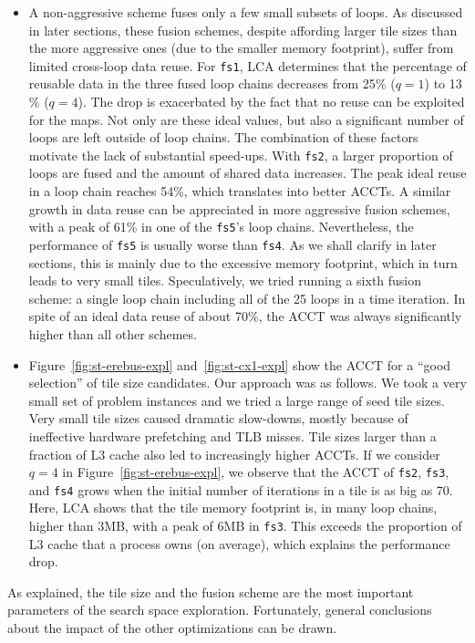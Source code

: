 \begin{itemize}
\item A non-aggressive scheme fuses only a few small subsets of loops. As discussed in later sections, these fusion schemes, despite affording larger tile sizes than the more aggressive ones (due to the smaller memory footprint), suffer from limited cross-loop data reuse. For {\tt fs1}, LCA determines that the percentage of reusable data in the three fused loop chains decreases from 25$\%$ ($q=1$) to 13$\%$ ($q=4$). The drop is exacerbated by the fact that no reuse can be exploited for the maps. Not only are these ideal values, but also a significant number of loops are left outside of loop chains. The combination of these factors motivate the lack of substantial speed-ups. With {\tt fs2}, a larger proportion of loops are fused and the amount of shared data increases. The peak ideal reuse in a loop chain reaches 54$\%$, which translates into better ACCTs. A similar growth in data reuse can be appreciated in more aggressive fusion schemes, with a peak of 61$\%$ in one of the {\tt fs5}'s loop chains.  Nevertheless, the performance of {\tt fs5} is usually worse than {\tt fs4}. As we shall clarify in later sections, this is mainly due to the excessive memory footprint, which in turn leads to very small tiles. Speculatively, we tried running a sixth fusion scheme: a single loop chain including all of the 25 loops in a time iteration. In spite of an ideal data reuse of about 70$\%$, the ACCT was always significantly higher than all other schemes.
\item Figure~\ref{fig:st-erebus-expl} and~\ref{fig:st-cx1-expl} show the ACCT for a ``good selection'' of tile size candidates. Our approach was as follows. We took a very small set of problem instances  and we tried a large range of seed tile sizes. Very small tile sizes caused dramatic slow-downs, mostly because of ineffective hardware prefetching and TLB misses. Tile sizes larger than a fraction of L3 cache also led to increasingly higher ACCTs. If we consider $q=4$ in Figure~\ref{fig:st-erebus-expl}, we observe that the ACCT of {\tt fs2}, {\tt fs3}, and {\tt fs4} grows when the initial number of iterations in a tile is as big as 70. Here, LCA shows that the tile memory footprint is, in many loop chains, higher than 3MB, with a peak of 6MB in {\tt fs3}. This exceeds the proportion of L3 cache that a process owns (on average), which explains the performance drop. 
\end{itemize}

As explained, the tile size and the fusion scheme are the most important parameters of the search space exploration. Fortunately, general conclusions about the impact of the other optimizations can be drawn.

